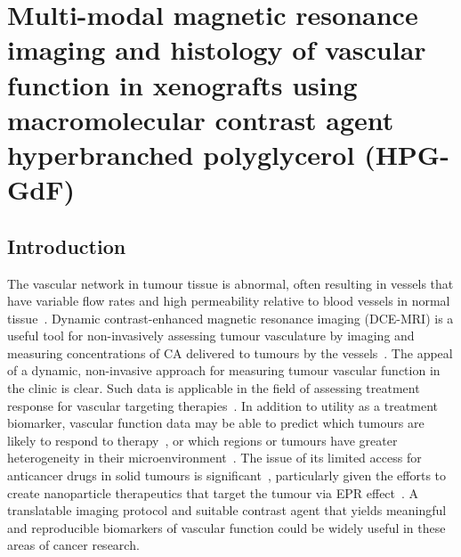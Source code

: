 
\chapter[MRI and histology of vascular function in xenografts using \acs{HPG-GdF}]{Multi-modal magnetic resonance imaging and histology of vascular function in xenografts using macromolecular contrast agent hyperbranched polyglycerol (HPG-GdF)}
\label{ch:HPG}

\section{Introduction}
The vascular network in tumour tissue is abnormal, often resulting in vessels that have variable flow rates and high permeability relative to blood vessels in normal tissue~\cite{McDonald:2002ut}.
Dynamic contrast-enhanced magnetic resonance imaging (DCE-MRI) is a useful tool for non-invasively assessing tumour vasculature by imaging and measuring concentrations of \acs{CA} delivered to tumours by the vessels~\cite{OConnor:2012ie,Barrett:2006jx,Leach:2003fy}.
The appeal of a dynamic, non-invasive approach for measuring tumour vascular function in the clinic is clear.
Such data is applicable in the field of assessing treatment response for vascular targeting therapies~\cite{OConnor:2012ie,Barrett:2006jx,Leach:2003fy}.
In addition to utility as a treatment biomarker, vascular function data may be able to predict which tumours are likely to respond to therapy~\cite{DeBruyne:2012cq,Kelly:2011cf,Bains:2009hh}, or which regions or tumours have greater heterogeneity in their microenvironment~\cite{OConnor:2011jm,Alic:2011hw}.
The issue of its limited access for anticancer drugs in solid tumours is significant~\cite{Minchinton:2006gs}, particularly given the efforts to create nanoparticle therapeutics that target the tumour via \acs{EPR} effect~\cite{Jain:2001uf,Iyer:2006gf,Chauhan:2011fi}.
A translatable imaging protocol and suitable contrast agent that yields meaningful and reproducible biomarkers of vascular function could be widely useful in these areas of cancer research.

